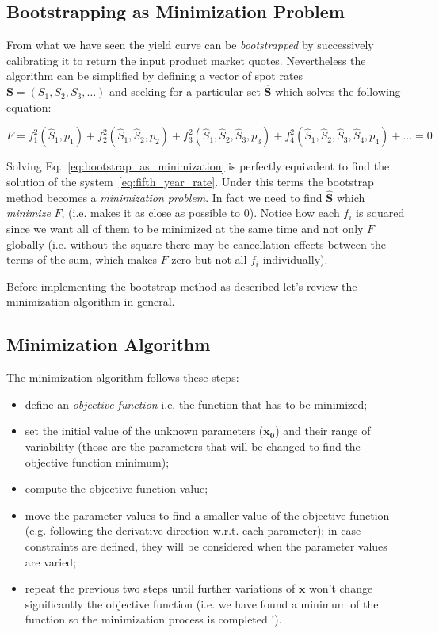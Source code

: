 \subsection{Bootstrapping as Minimization Problem}
\label{sec:bootstrap_as_minimization}

From what we have seen the yield curve can be \emph{bootstrapped} by successively calibrating it to return the input product market quotes.
Nevertheless the algorithm can be simplified by defining a vector of spot rates $\mathbf{S} = (S_1, S_2, S_3, \ldots)$ and seeking for a particular set $\mathbf{\hat{S}}$ which solves the following equation:

\begin{equation}
F = f_1^2(\hat{S}_1,p_1) + f_2^2(\hat{S}_1, \hat{S}_2,p_2) + f_3^2(\hat{S}_1, \hat{S}_2, \hat{S}_3,p_3) + f_4^2(\hat{S}_1, \hat{S}_2, \hat{S}_3, \hat{S}_4,p_4) + \ldots = 0
\label{eq:bootstrap_as_minimization}
\end{equation}

Solving Eq.~\ref{eq:bootstrap_as_minimization} is perfectly equivalent to find the solution of the system~\ref{eq:fifth_year_rate}.
Under this terms the bootstrap method becomes a \emph{minimization problem}. In fact we need to find $\mathbf{\hat{S}}$ which \emph{minimize} $F$, (i.e. makes it as close as possible to 0).
Notice how each $f_i$ is squared since we want all of them to be minimized at the same time and not only $F$ globally (i.e. without the square there may be cancellation effects between the terms of the sum, which makes $F$ zero but not all $f_i$ individually).

Before implementing the bootstrap method as described let's review the minimization algorithm in general.

\subsection{Minimization Algorithm}
\label{minimization-algorithm}

The minimization algorithm follows these steps:

\begin{itemize}
\tightlist
\item
  define an \emph{objective function} i.e. the function that has to be minimized;
\item
  set the initial value of the unknown parameters ($\mathbf{x_0}$) and their range of variability (those are the parameters that will be changed to find the objective function minimum);
\item
  compute the objective function value;
\item
  move the parameter values to find a smaller value of the objective function (e.g. following the derivative direction w.r.t. each parameter); in case constraints are defined, they will be considered when the parameter values are varied;
\item
  repeat the previous two steps until further variations of $\mathbf{x}$ won't change significantly the objective
  function (i.e. we have found a minimum of the function so the minimization process is completed !).
\end{itemize}

